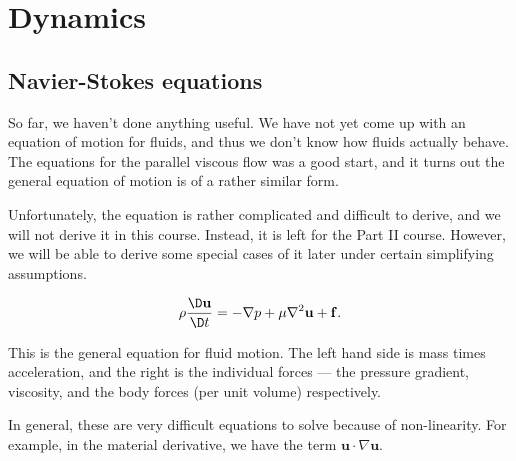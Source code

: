 \documentclass[a4paper]{article}
\begin{document}
\section{Dynamics}
\subsection{Navier-Stokes equations}
So far, we haven't done anything useful. We have not yet come up with an equation of motion for fluids, and thus we don't know how fluids actually behave. The equations for the parallel viscous flow was a good start, and it turns out the general equation of motion is of a rather similar form.

Unfortunately, the equation is rather complicated and difficult to derive, and we will not derive it in this course. Instead, it is left for the Part II course. However, we will be able to derive some special cases of it later under certain simplifying assumptions.
\begin{law}
  \[
    \rho \frac{\D \mathbf{u}}{\D t} = - \nabla p + \mu \nabla^2 \mathbf{u} + \mathbf{f}.
  \]
\end{law}
This is the general equation for fluid motion. The left hand side is mass times acceleration, and the right is the individual forces --- the pressure gradient, viscosity, and the body forces (per unit volume) respectively.

In general, these are very difficult equations to solve because of non-linearity. For example, in the material derivative, we have the term $\mathbf{u} \cdot \nabla \mathbf{u}$.
\end{document}
